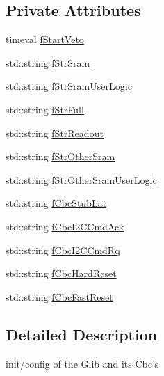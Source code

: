 \subsection*{Private Attributes}
\begin{CompactItemize}
\item 
timeval \hyperlink{class_ph2___hw_interface_1_1_glib_f_w_interface_211b2606feb8fad3ac74f00b2d089ade}{f\-Start\-Veto}
\item 
std::string \hyperlink{class_ph2___hw_interface_1_1_glib_f_w_interface_3fd05ec282e3485d13f3d4271f622039}{f\-Str\-Sram}
\item 
std::string \hyperlink{class_ph2___hw_interface_1_1_glib_f_w_interface_ee5e3a859a56e2ab7cead5100714851c}{f\-Str\-Sram\-User\-Logic}
\item 
std::string \hyperlink{class_ph2___hw_interface_1_1_glib_f_w_interface_2d5e62e2689d9a0b0ac542ea1ea49b2c}{f\-Str\-Full}
\item 
std::string \hyperlink{class_ph2___hw_interface_1_1_glib_f_w_interface_1c2f018359fc0fc7f9652d6058ac94f1}{f\-Str\-Readout}
\item 
std::string \hyperlink{class_ph2___hw_interface_1_1_glib_f_w_interface_1f3b7bdef0d23e16f014a56aea92209c}{f\-Str\-Other\-Sram}
\item 
std::string \hyperlink{class_ph2___hw_interface_1_1_glib_f_w_interface_875ddab3eef88b4c9b829c1b4bb03d3f}{f\-Str\-Other\-Sram\-User\-Logic}
\item 
std::string \hyperlink{class_ph2___hw_interface_1_1_glib_f_w_interface_96e1ee562be7a0430ec976df840b8b3d}{f\-Cbc\-Stub\-Lat}
\item 
std::string \hyperlink{class_ph2___hw_interface_1_1_glib_f_w_interface_a2c87823ad0d9c2da49526eeef10c8e6}{f\-Cbc\-I2CCmd\-Ack}
\item 
std::string \hyperlink{class_ph2___hw_interface_1_1_glib_f_w_interface_a46f35b8ba4a764c83a8cfc1ddf15f1e}{f\-Cbc\-I2CCmd\-Rq}
\item 
std::string \hyperlink{class_ph2___hw_interface_1_1_glib_f_w_interface_c7410b226fffc5a361386f6e6c3b96e0}{f\-Cbc\-Hard\-Reset}
\item 
std::string \hyperlink{class_ph2___hw_interface_1_1_glib_f_w_interface_16633bf7e8c4d61cacd8a6862673221c}{f\-Cbc\-Fast\-Reset}
\end{CompactItemize}


\subsection{Detailed Description}
init/config of the Glib and its Cbc's 



